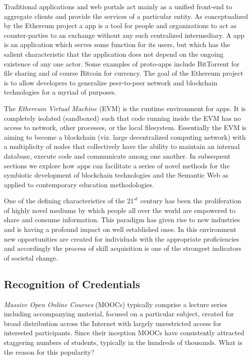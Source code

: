 Traditional applications and web portals act mainly as a unified front-end to aggregate clients and provide the services of a particular entity. 
As conceptualized by the Ethereum project a \DJ{}app is a tool for people and organizations to act as counter-parties to an exchange without any such centralized intermediary.
A \DJ{}app is an application which serves some function for its users, but which has the salient characteristic that the application does not depend on the ongoing existence of any one actor. 
Some examples of proto-\DJ{}apps include BitTorrent for file sharing and of course Bitcoin for currency. 
The goal of the Ethereum project is to allow developers to generalize peer-to-peer network and blockchain technologies for a myriad of purposes.

The \emph{Ethereum Virtual Machine} (EVM) is the runtime environment for \DJ{}apps.  It is completely isolated (sandboxed) such that code running inside the EVM has no access to network, other processes, or the local filesystem.
Essentially the EVM is aiming to become a blockchain (viz. large decentralized computing network) with a multiplicity of nodes that collectively have the ability to maintain an internal database, execute code and communicate among one another.
In subsequent sections we explore how \DJ{}apps can facilitate a series of novel methods for the symbiotic development of blockchain technologies and the Semantic Web as applied to contemporary education methodologies. 

One of the defining characteristics of the $21^{st}$ century has been the proliferation of highly novel mediums by which people all over the world are empowered to share and consume information. 
This paradigm has given rise to new industries and is having a profound impact on well established ones. 
In this environment new opportunities are created for individuals with the appropriate proficiencies and accordingly the process of skill acquisition is one of the strongest indicators of societal change.

\subsection{Recognition of Credentials}

\emph{Massive Open Online Courses} (MOOCs) typically comprise a lecture series including accompanying material, focused on a particular subject, created for broad distribution across the Internet with largely unrestricted access for interested participants. 
Since their inception MOOCs have consistently attracted staggering numbers of students, typically in the hundreds of thousands.  
What is the reason for this popularity?

